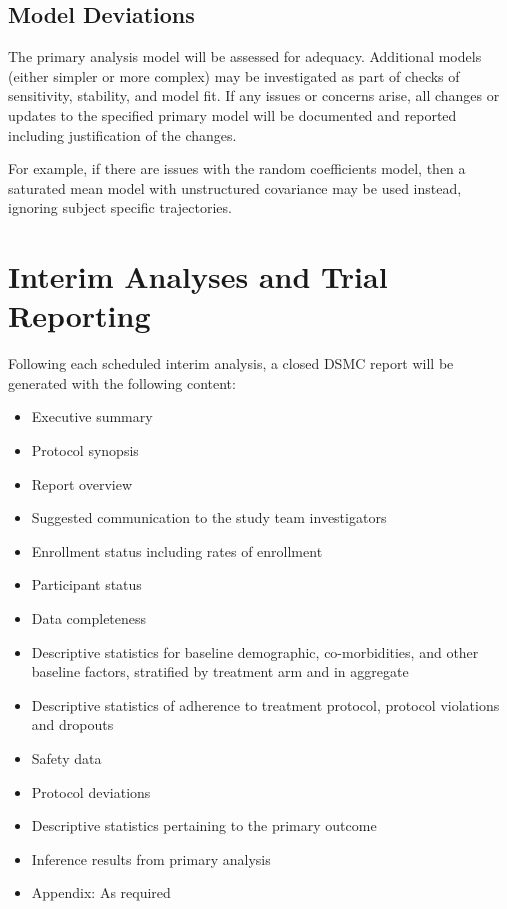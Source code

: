 \documentclass[
]{article}
\providecommand{\tightlist}{%
  \setlength{\itemsep}{0pt}\setlength{\parskip}{0pt}}
\begin{document}
\hypertarget{model-deviations}{%
  \subsection{Model Deviations}\label{model-deviations}}

The primary analysis model will be assessed for adequacy.
Additional models (either simpler or more complex) may be investigated as part of checks of sensitivity, stability, and model fit.
If any issues or concerns arise, all changes or updates to the specified primary model will be documented and reported including justification of the changes.

For example, if there are issues with the random coefficients model, then a saturated mean model with unstructured covariance may be used instead, ignoring subject specific trajectories.

\clearpage

\hypertarget{interim-analyses-and-trial-reporting}{%
  \section{Interim Analyses and Trial Reporting}\label{interim-analyses-and-trial-reporting}}

Following each scheduled interim analysis, a closed DSMC report will be generated with the following content:

\begin{itemize}\tightlist
  \item
        Executive summary
  \item
        Protocol synopsis
  \item
        Report overview
  \item
        Suggested communication to the study team investigators
  \item
        Enrollment status including rates of enrollment
  \item
        Participant status
  \item 
        Data completeness
  \item
        Descriptive statistics for baseline demographic, co-morbidities, and other baseline factors, stratified by treatment arm and in aggregate
  \item
        Descriptive statistics of adherence to treatment protocol, protocol violations and dropouts
  \item
        Safety data
  \item
        Protocol deviations
  \item 
        Descriptive statistics pertaining to the primary outcome
  \item
        Inference results from primary analysis
  \item
        Appendix: As required
\end{itemize}
\end{document}
